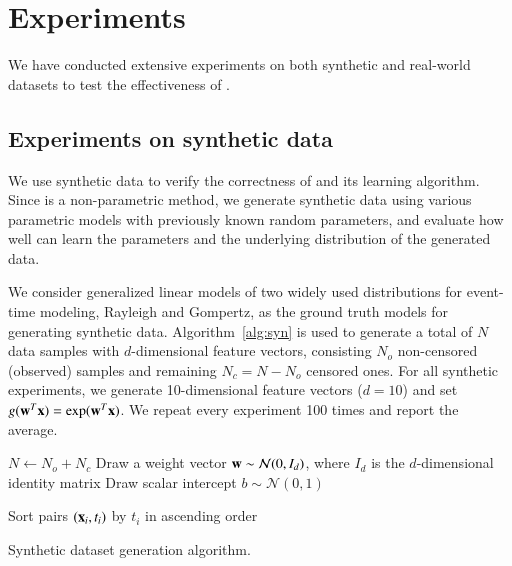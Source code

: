 \section{Experiments}\label{sec:results}

We have conducted extensive experiments on both synthetic and real-world datasets to test the effectiveness of \npglm.

\subsection{Experiments on synthetic data}
We use synthetic data to verify the correctness of \npglm and its learning algorithm. Since \npglm is a non-parametric method, we generate synthetic data using various parametric models with previously known random parameters, and evaluate how well \npglm can learn the parameters and the underlying distribution of the generated data.

We consider generalized linear models of two widely used distributions for event-time modeling, Rayleigh and Gompertz, as the ground truth models for generating synthetic data. Algorithm~\ref{alg:syn} is used to generate a total of $N$ data samples with $d$-dimensional feature vectors, consisting $N_o$ non-censored (observed) samples and remaining $N_c=N-N_o$ censored ones. For all synthetic experiments, we generate 10-dimensional feature vectors ($d=10$) and set $g(\mathbf{w}^T\mathbf{x})=\exp(\mathbf{w}^T\mathbf{x})$. We repeat every experiment 100 times and report the average.

\begin{algorithm}[t]
	\small
	\SetAlgoLined
	$N\leftarrow N_o+N_c$\;
	Draw a weight vector $\mathbf{w}\sim\mathcal{N}(0,I_d)$, where $I_d$ is the $d$-dimensional identity matrix\;
	Draw scalar intercept $b\sim\mathcal{N}(0,1)$\;
	
	Sort pairs $(\mathbf{x}_i,t_i)$ by $t_i$ in ascending order\;
	
	\caption{Synthetic dataset generation algorithm.}
	\label{alg:syn}
\end{algorithm}


